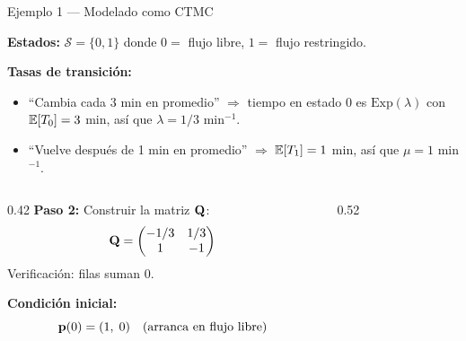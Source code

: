 \documentclass[aspectratio=1610, 9pt]{beamer}
\begin{document}
\begin{frame}{Ejemplo 1 --- Modelado como CTMC}
\begin{modelobox}
\textbf{Estados:} $\mathcal{S} = \{0, 1\}$ donde $0 =$ flujo libre, $1 =$ flujo restringido.

\textbf{Tasas de transici\'on:}
\begin{itemize}
\item ``Cambia cada 3 min en promedio'' $\Rightarrow$ tiempo en estado 0 es $\text{Exp}(\lambda)$ con $\mathbb{E}[T_0] = 3$ min, as\'i que $\lambda = 1/3$ min$^{-1}$.
\item ``Vuelve despu\'es de 1 min en promedio'' $\Rightarrow$ $\mathbb{E}[T_1] = 1$ min, as\'i que $\mu = 1$ min$^{-1}$.
\end{itemize}
\end{modelobox}

\begin{columns}[c]
\begin{column}{0.42\textwidth}
\textbf{Paso 2:} Construir la matriz $\mathbf{Q}$:
\[
\mathbf{Q} = \begin{pmatrix} -1/3 & 1/3 \\ 1 & -1 \end{pmatrix}
\]
Verificaci\'on: filas suman 0. \checkmark

\vspace{6pt}
\textbf{Condici\'on inicial:}
\[
\mathbf{p}(0) = (1,\; 0) \quad \text{(arranca en flujo libre)}
\]
\end{column}
\begin{column}{0.52\textwidth}
\centering
{}
\end{column}
\end{columns}
\end{frame}
\end{document}
